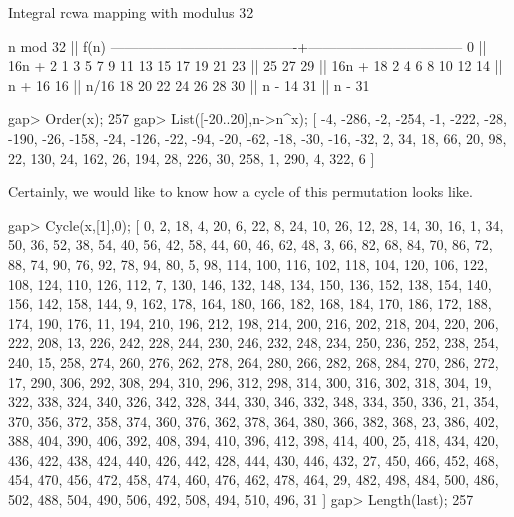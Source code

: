 Integral rcwa mapping with modulus 32

               n mod 32                 ||              f(n)              
----------------------------------------+---------------------------------
   0                                    || 16n + 2
   1  3  5  7  9 11 13 15 17 19 21 23   || 
  25 27 29                              || 16n + 18
   2  4  6  8 10 12 14                  || n + 16
  16                                    || n/16
  18 20 22 24 26 28 30                  || n - 14
  31                                    || n - 31

gap> Order(x);
257
gap> List([-20..20],n->n^x);
[ -4, -286, -2, -254, -1, -222, -28, -190, -26, -158, -24, -126, -22, -94, 
  -20, -62, -18, -30, -16, -32, 2, 34, 18, 66, 20, 98, 22, 130, 24, 162, 26, 
  194, 28, 226, 30, 258, 1, 290, 4, 322, 6 ]

\endexample

Certainly, we would like to know how a cycle of this permutation looks
like.

\beginexample
gap> Cycle(x,[1],0);
[ 0, 2, 18, 4, 20, 6, 22, 8, 24, 10, 26, 12, 28, 14, 30, 16, 1, 34, 50, 36,
  52, 38, 54, 40, 56, 42, 58, 44, 60, 46, 62, 48, 3, 66, 82, 68, 84, 70, 86,
  72, 88, 74, 90, 76, 92, 78, 94, 80, 5, 98, 114, 100, 116, 102, 118, 104,
  120, 106, 122, 108, 124, 110, 126, 112, 7, 130, 146, 132, 148, 134, 150,
  136, 152, 138, 154, 140, 156, 142, 158, 144, 9, 162, 178, 164, 180, 166,
  182, 168, 184, 170, 186, 172, 188, 174, 190, 176, 11, 194, 210, 196, 212,
  198, 214, 200, 216, 202, 218, 204, 220, 206, 222, 208, 13, 226, 242, 228,
  244, 230, 246, 232, 248, 234, 250, 236, 252, 238, 254, 240, 15, 258, 274,
  260, 276, 262, 278, 264, 280, 266, 282, 268, 284, 270, 286, 272, 17, 290,
  306, 292, 308, 294, 310, 296, 312, 298, 314, 300, 316, 302, 318, 304, 19,
  322, 338, 324, 340, 326, 342, 328, 344, 330, 346, 332, 348, 334, 350, 336,
  21, 354, 370, 356, 372, 358, 374, 360, 376, 362, 378, 364, 380, 366, 382,
  368, 23, 386, 402, 388, 404, 390, 406, 392, 408, 394, 410, 396, 412, 398,
  414, 400, 25, 418, 434, 420, 436, 422, 438, 424, 440, 426, 442, 428, 444,
  430, 446, 432, 27, 450, 466, 452, 468, 454, 470, 456, 472, 458, 474, 460,
  476, 462, 478, 464, 29, 482, 498, 484, 500, 486, 502, 488, 504, 490, 506,
  492, 508, 494, 510, 496, 31 ]
gap> Length(last);
257
\endexample


